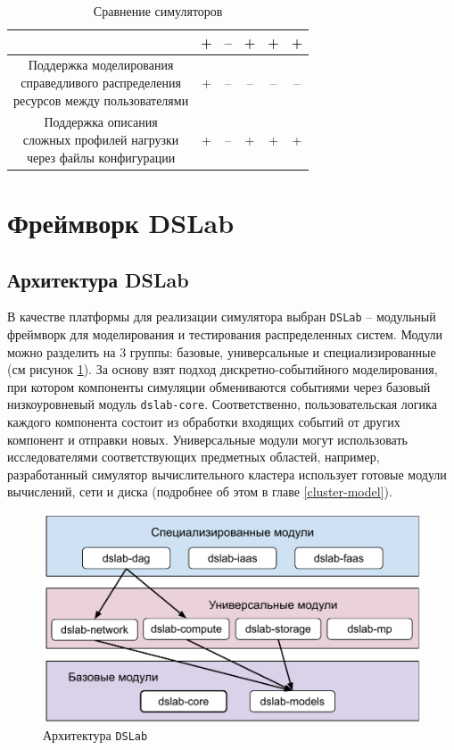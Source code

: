 \begin{table}[h!]
\begin{tabular}{|c|c|c|c|c|c|}
{} & + & -- & + & + & + \\
\hline 
\makecell[cc]{
  Поддержка моделирования \\ справедливого распределения \\ ресурсов между пользователями
} & + & -- & -- & -- & -- \\
\hline
\makecell[cc]{
Поддержка описания \\ сложных профилей нагрузки \\ через файлы конфигурации }& + & -- & + & + & + \\
\hline  
\end{tabular}
\caption{Сравнение симуляторов}
\label{tab:sim-compare}
\end{table}



\section{Фреймворк DSLab}\label{sec:dslab}

\subsection{Архитектура DSLab}


В качестве платформы для реализации симулятора выбран \texttt{DSLab} -- модульный фреймворк для моделирования и тестирования распределенных систем. Модули можно разделить на 3 группы: базовые, универсальные и специализированные (см рисунок \ref{fig:dslab_arc}). За основу взят подход дискретно-событийного моделирования, при котором компоненты симуляции обмениваются событиями через базовый низкоуровневый модуль \texttt{dslab-core}. Соответственно, пользовательская логика каждого компонента состоит из обработки входящих событий от других компонент и отправки новых. Универсальные модули могут использовать исследователями соответствующих предметных областей, например, разработанный симулятор вычислительного кластера использует готовые модули вычислений, сети и диска (подробнее об этом в главе \ref{cluster-model}). 

\begin{figure}[H]
    \centering
\includegraphics[width=0.7\linewidth]{images/dslab_arc}
\caption{Архитектура \texttt{DSLab}}
\label{fig:dslab_arc}
\end{figure}

